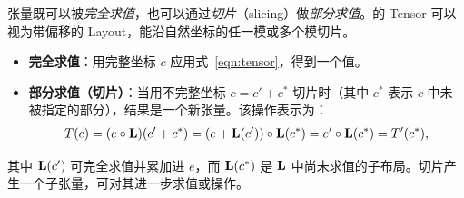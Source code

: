 

\label{sec:slicing}

张量既可以被{\em 完全求值}，也可以通过{\em 切片}（slicing）做{\em 部分求值}。\CuTe 的 Tensor 可以视为带偏移的 Layout，能沿自然坐标的任一模或多个模切片。

\begin{itemize}[itemsep=0pt,topsep=2pt]
\item \textbf{完全求值}：用完整坐标 $c$ 应用式~\eqref{eqn:tensor}，得到一个值。
\item \textbf{部分求值（切片）}：当用不完整坐标 $c = c' + c^*$ 切片时（其中 $c^*$ 表示 $c$ 中未被指定的部分），结果是一个新张量。该操作表示为：
\begin{align}
T(c) = (e \circ \mathbf{L})(c'+ c^*) = (e + \mathbf{L}(c')) \circ \mathbf{L}(c^*) = e' \circ \mathbf{L}(c^*) = T'(c^*),
\end{align}
\end{itemize}
其中 $\mathbf{L}(c')$ 可完全求值并累加进 $e$，而 $\mathbf{L}(c^*)$ 是 $\mathbf{L}$ 中尚未求值的子布局。切片产生一个子张量，可对其进一步求值或操作。

